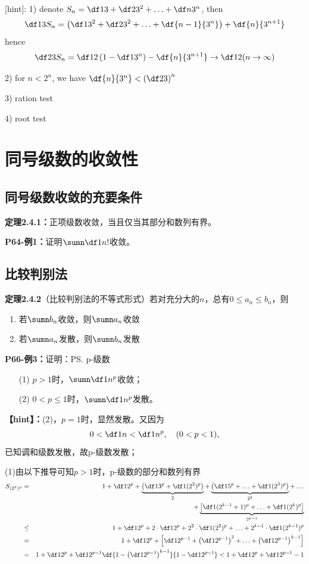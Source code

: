 [hint]: 1) denote $S_n=\df13+\df2{3^2}+\ldots+\df n{3^n}$, then
$$\df13S_n=\left(\df1{3^2}+\df2{3^2}+\ldots
+\df{n-1}{3^n}\right)+\df{n}{3^{n+1}}$$
hence
$$\df23S_n=\df12\left(1-\df1{3^n}\right)-\df{n}{3^{n+1}}\to\df12
(n\to\infty)$$

2) for $n<2^n$, we have $\df{n}{3^n}<\left(\df23\right)^n$

3) ration test

4) root test

\section{同号级数的收敛性}

\subsection{同号级数收敛的充要条件}

{\bf 定理2.4.1：}正项级数收敛，当且仅当其部分和数列有界。

{\bf P64-例1：}证明$\sumn\df1{n!}$收敛。

\subsection{比较判别法}

{\bf 定理2.4.2}（比较判别法的不等式形式）若对充分大的$n$，总有$0\leq a_n\leq b_n$，则
\begin{enumerate}
  \setlength{\itemindent}{1cm}
  \item 若$\sumn b_n$收敛，则$\sumn a_n$收敛
  \item 若$\sumn a_n$发散，则$\sumn b_n$发散
\end{enumerate}

{\bf P66-例3：}证明：\ps{p-级数}
\begin{enumerate}[(1)]
  \setlength{\itemindent}{1cm}
  \item[(1)] $p>1$时，$\sumn\df1{n^p}$收敛；
  \item[(2)] $0<p\leq 1$时，$\sumn\df1{n^p}$发散。
\end{enumerate}

{\bf 【hint】：}(2)，$p=1$时，显然发散。又因为
$$0<\df 1n<\df 1{n^p},\quad (0<p<1),$$
已知调和级数发散，故p-级数发散；

(1)由以下推导可知$p>1$时，p-级数的部分和数列有界
\begin{eqnarray*}
	S_{(2^k)^p}&=&1+\df 1{2^p}+\underbrace{\left(\df1{3^p}+\df1{(2^2)^p}\right)}_2
				+\underbrace{\left(\df1{5^p}+\ldots+\df1{(2^3)^p}\right)}_{2^2}+\ldots\\
				&&+\underbrace{\left[\df1{(2^{k-1}+1)^p}+\ldots+\df1{(2^k)^p}\right]}_{2^{k-1}}\\
			  &\leq &1+\df 1{2^p}+2\cdot\df1{2^p}+2^2\cdot\df1{(2^2)^p}
			    +\ldots+2^{k-1}\cdot\df1{(2^{k-1})^p}\\
			  &=&1+\df 1{2^p}+\left[\df1{2^{p-1}}+\left(\df1{2^{p-1}}\right)^2+
			    \ldots+\left(\df1{2^{p-1}}\right)^{k-1}\right]\\
			  &=&1+\df 1{2^p}+\df1{2^{p-1}}\df{1-\left(\df1{2^{p-1}}\right)
			    ^{k-1}}{1-\df1{2^{p-1}}}<1+\df 1{2^p}+\df1{2^{p-1}-1}
\end{eqnarray*}

